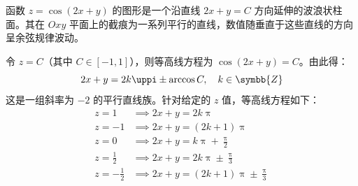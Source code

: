 \begin{solution}
    函数 $z = \cos(2x + y)$ 的图形是一个沿直线 $2x + y = C$ 方向延伸的波浪状柱面。其在 $Oxy$ 平面上的截痕为一系列平行的直线，数值随垂直于这些直线的方向呈余弦规律波动。

    \begin{center}
    \end{center}

    令 $z = C$（其中 $C \in [-1, 1]$），则等高线方程为 $\cos(2x + y) = C$。由此得：
    \begin{equation}
        2x + y = 2k\uppi \pm \arccos C, \quad k \in \symbb{Z}
    \end{equation}
    这是一组斜率为 $-2$ 的平行直线族。针对给定的 $z$ 值，等高线方程如下：
    \begin{equation}
        \begin{aligned}
            z = 1            & \implies 2x + y = 2k\uppi                         \\
            z = -1           & \implies 2x + y = (2k+1)\uppi                     \\
            z = 0            & \implies 2x + y = k\uppi + \frac{\uppi}{2}        \\
            z = \frac{1}{2}  & \implies 2x + y = 2k\uppi \pm \frac{\uppi}{3}     \\
            z = -\frac{1}{2} & \implies 2x + y = (2k+1)\uppi \pm \frac{\uppi}{3}
        \end{aligned}
    \end{equation}


\end{solution}
